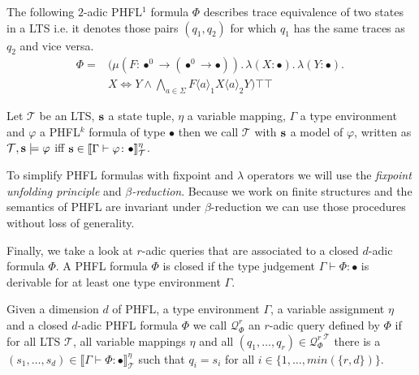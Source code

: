 \begin{example}{\cite{lange2014capturing}}
   \label{example:phfl_order_2}
   The following $2$-adic PHFL$^1$ formula $\Phi$ describes trace equivalence of two states in a LTS i.e. it denotes
   those pairs $(q_1, q_2)$ for which $q_1$ has the same traces as $q_2$ and vice versa.
    \begin{align*}
        \Phi = &(\mu (F \colon \bullet^0 \rightarrow (\bullet^0 \rightarrow \bullet)).\,
        \lambda (X \colon \bullet).\, \lambda (Y \colon \bullet).\, \\&X \Leftrightarrow Y \wedge
        \underset{a \in \Sigma}{\bigwedge} F \langle a \rangle_1 X \langle a \rangle_2 Y)\top \top
    \end{align*}
\end{example}

\begin{definition}
    Let $\mathcal{T}$ be an LTS, $\emph{s}$ a state tuple, $\eta$ a variable mapping, $\Gamma$ a type environment and
    $\varphi$ a PHFL$^k$ formula of type $\bullet$ then we call $\mathcal{T}$ with $\emph{s}$ a model of $\varphi$,
    written as $\mathcal{T}, \emph{s} \models \varphi$ iff $\emph{s} \in \llbracket \Gamma
    \vdash \varphi \colon \bullet \rrbracket^\eta_\mathcal{T}$.
\end{definition}

\begin{remark}
To simplify PHFL formulas with fixpoint and $\lambda$ operators we will use the \emph{fixpoint unfolding principle} and \emph{$\beta$-reduction}. Because we work on finite structures and the semantics of PHFL are invariant under $\beta$-reduction we can use those procedures without loss of generality.
\end{remark}

Finally, we take a look at $r$-adic queries that are associated to a
closed $d$-adic formula $\Phi$. A PHFL formula $\Phi$ is closed if the type judgement $\Gamma \vdash \Phi \colon \bullet$ is derivable for at least one type environment $\Gamma$.

\begin{definition}
\label{definition:query_associated_to_formula}
    Given a dimension $d$ of PHFL, a type environment $\Gamma$, a variable assignment $\eta$ and a closed $d$-adic PHFL
    formula $\Phi$ we call $\mathcal{Q}^r_\Phi$ an $r$-adic query defined by $\Phi$ if for all LTS
    $\mathcal{T}$, all variable mappings $\eta$ and all $(q_1, \dots, q_r) \in {\mathcal{Q}^r_\Phi}^\mathcal{T}$ there is a $(s_1, \dots, s_d) \in
    \llbracket \Gamma \vdash \Phi \colon \bullet \rrbracket^\eta_\mathcal{T}$ such that $q_i = s_i$ for all $i \in
    \{1, \dots, min(\{r, d\})\}$.
\end{definition}

